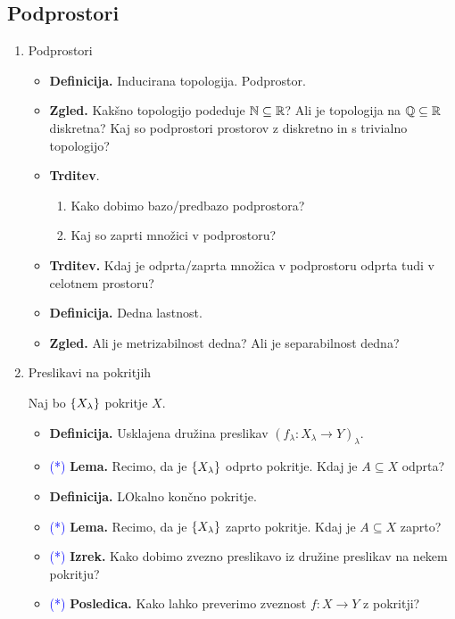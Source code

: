 \subsection{Podprostori}
\begin{enumerate}
    \item Podprostori
    \begin{itemize}
        \item \textbf{Definicija.} Inducirana topologija. Podprostor.
        \item \textbf{Zgled.} Kakšno topologijo podeduje \(\mathbb{N} \subseteq \mathbb{R}\)? Ali je topologija na \(\mathbb{Q} \subseteq \mathbb{R}\) diskretna? Kaj so podprostori prostorov z diskretno in s trivialno topologijo?
        \item \textbf{Trditev}.
        \begin{enumerate}
            \item Kako dobimo bazo/predbazo podprostora?
            \item Kaj so zaprti množici v podprostoru?
        \end{enumerate}
        \item \textbf{Trditev.} Kdaj je odprta/zaprta množica v podprostoru odprta tudi v celotnem prostoru?
        \item \textbf{Definicija.} Dedna lastnost.
        \item \textbf{Zgled.} Ali je metrizabilnost dedna? Ali je separabilnost dedna?
    \end{itemize}

    \item Preslikavi na pokritjih
    
    Naj bo \(\{X_\lambda\}\) pokritje \(X\).
    \begin{itemize}
        \item \textbf{Definicija.} Usklajena družina preslikav \((f_\lambda: X_\lambda \to Y)_\lambda\).
        \item \textcolor{blue}{(*)} \textbf{Lema.} Recimo, da je \(\{X_\lambda\}\) odprto pokritje. Kdaj je \(A \subseteq X\) odprta?
        \item \textbf{Definicija.} LOkalno končno pokritje.
        \item \textcolor{blue}{(*)} \textbf{Lema.} Recimo, da je \(\{X_\lambda\}\) zaprto pokritje. Kdaj je \(A \subseteq X\) zaprto?
        \item \textcolor{blue}{(*)} \textbf{Izrek.} Kako dobimo zvezno preslikavo iz družine preslikav na nekem pokritju?
        \item \textcolor{blue}{(*)} \textbf{Posledica.} Kako lahko preverimo zveznost \(f: X \to Y\) z pokritji?
    \end{itemize}


\end{enumerate}
